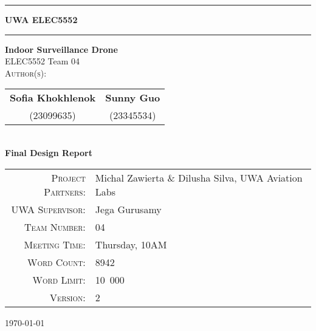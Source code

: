 \begin{titlepage}

\noindent\rule{\textwidth}{0.5pt}
\begin{flushright}
    \textbf{UWA ELEC5552}
\end{flushright}
\rule{\textwidth}{0.5pt}

\vspace{2cm}

\thispagestyle{empty}

\begin{center}
    {\Huge \textbf{Indoor Surveillance Drone}} \\[0.75cm]
    {\Large ELEC5552 Team 04} \\[1.5cm]

    \textsc{Author(s):} \\[0.5cm]

    \begin{tabular}{@{}c@{\hskip 1cm}c@{}}
        \textbf{Sofia Khokhlenok} & \textbf{Sunny Guo} \\[0.2cm]
        (23099635) & (23345534) \\
    \end{tabular} \\[1.5cm]

    {\Large \textbf{Final Design Report}} \\[0.5cm]
\end{center}

\vspace{1.5cm}

\begin{center}
\begin{tabular}{rl}
\textsc{Project Partners:} & Michal Zawierta \& Dilusha Silva, UWA Aviation Labs \\
\textsc{UWA Supervisor:} & Jega Gurusamy \\
\textsc{Team Number:} & 04 \\
\textsc{Meeting Time:} & Thursday, 10AM \\
\textsc{Word Count:} & 8942 \\
\textsc{Word Limit:} & 10~000 \\
\textsc{Version:} & 2 \\
\end{tabular}
\end{center}

\vfill

\begin{center}
    \large \today
\end{center}

\end{titlepage}
